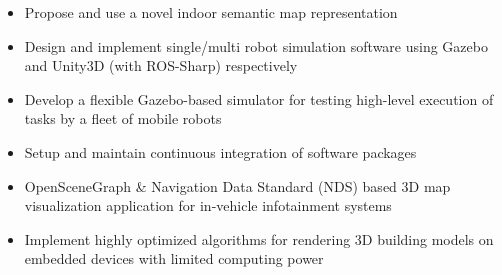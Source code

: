\documentclass[10pt,a4paper,ragged2e]{altacv}
\begin{document}



\begin{itemize}
    \item Propose and use a novel indoor semantic map representation
    \item Design and implement single/multi robot simulation software using Gazebo and Unity3D (with ROS-Sharp) respectively
\end{itemize}

\divider

\begin{itemize}
    \item Develop a flexible Gazebo-based simulator for testing high-level execution of tasks by a fleet of mobile robots
    \item Setup and maintain continuous integration of software packages
\end{itemize}

\divider

\begin{itemize}
    \item OpenSceneGraph \& Navigation Data Standard (NDS) based 3D map visualization application for in-vehicle infotainment systems
    \item Implement highly optimized algorithms for rendering 3D building models on embedded devices with limited computing power
\end{itemize}
\end{document}
